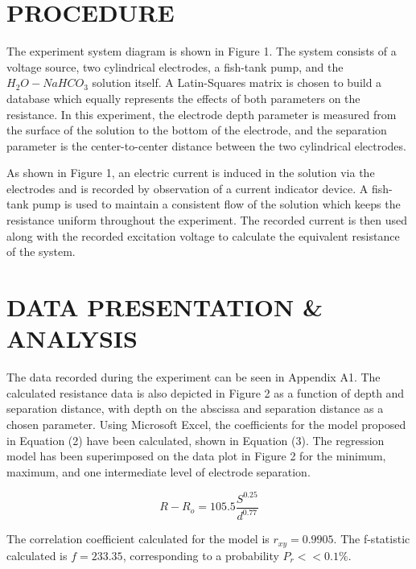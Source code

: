 \documentclass[12pt]{article}
\begin{document}
\section*{\fontsize{12}{12}\selectfont PROCEDURE}
The experiment system diagram is shown in Figure 1. The system consists of a voltage source, two cylindrical electrodes, a fish-tank pump, and the $H_2O - NaHCO_3$ solution itself. A Latin-Squares matrix is chosen to build a database which equally represents the effects of both parameters on the resistance. In this experiment, the electrode depth parameter is measured from the surface of the solution to the bottom of the electrode, and the separation parameter is the center-to-center distance between the two cylindrical electrodes. 
\bigskip

As shown in Figure 1, an electric current is induced in the solution via the electrodes and is recorded by observation of a current indicator device. A fish-tank pump is used to maintain a consistent flow of the solution which keeps the resistance uniform throughout the experiment. The recorded current is then used along with the recorded excitation voltage to calculate the equivalent resistance of the system.


\section*{\fontsize{12}{12}\selectfont DATA PRESENTATION \& ANALYSIS}
The data recorded during the experiment can be seen in Appendix A1. The calculated resistance data is also depicted in Figure 2 as a function of depth and separation distance, with depth on the abscissa and separation distance as a chosen parameter. Using Microsoft Excel, the coefficients for the model proposed in Equation (2) have been calculated, shown in Equation (3). The regression model has been superimposed on the data plot in Figure 2 for the minimum, maximum, and one intermediate level of electrode separation.
\bigskip

\begin{equation}
R-R_o = 105.5\frac{S^{0.25}}{d^{0.77}}
\end{equation}

\bigskip

The correlation coefficient calculated for the model is $r_{xy}=0.9905$. The f-statistic calculated is $f=233.35$, corresponding to a probability $P_r << 0.1\%.$
\end{document}
